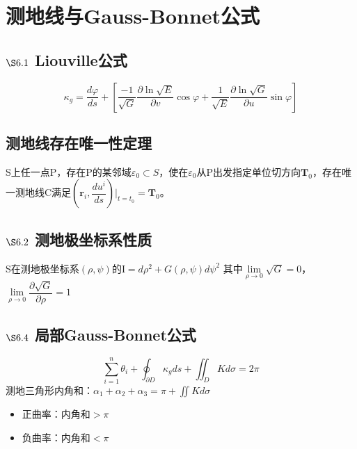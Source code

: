 \documentclass{article}
\begin{document}
	\section{测地线与Gauss-Bonnet公式}
	\subsection{$\S6.1$ Liouville公式}
	\[
	\kappa_g=\dfrac{d\varphi}{ds}+\left[\dfrac{-1}{\sqrt{G}}\dfrac{\partial\ln\sqrt{E}}{\partial v}\cos\varphi+\dfrac{1}{\sqrt{E}}\dfrac{\partial\ln\sqrt{G}}{\partial u}\sin\varphi\right]
	\]
	
	\subsection{测地线存在唯一性定理}
	S上任一点P，存在P的某邻域$\varepsilon_0\subset S$，使在$\varepsilon_0$从P出发指定单位切方向$\boldsymbol{T}_0$，存在唯一测地线C满足$\left(\boldsymbol{r}_i,\dfrac{du^i}{ds}\right)\bigg|_{t=t_0}=\boldsymbol{T}_0$。
	
	\subsection{$\S6.2$ 测地极坐标系性质}
	S在测地极坐标系$(\rho,\psi)$的$\mathrm{I}=d\rho^2+G(\rho,\psi)d\psi^2$
	其中$\lim\limits_{\rho\to0}\sqrt{G}=0$，$\lim\limits_{\rho\to0}\dfrac{\partial\sqrt{G}}{\partial\rho}=1$
	
	\subsection{$\S6.4$ 局部Gauss-Bonnet公式}
	\[
	\sum_{i=1}^n\theta_i+\oint_{\partial D}\kappa_gds+\iint_DKd\sigma=2\pi
	\]
	测地三角形内角和：$\alpha_1+\alpha_2+\alpha_3=\pi+\iint Kd\sigma$
	\begin{itemize}
		\item 正曲率：内角和$>\pi$
		\item 负曲率：内角和$<\pi$
	\end{itemize}
\end{document}

